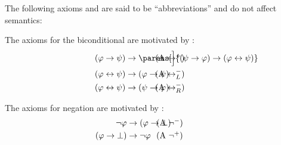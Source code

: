 \begin{definition}
  The following axioms and are said to be \enquote{abbreviations} and do not affect semantics:
  \begin{thmenum}[resume=def:minimal_propositional_axiomatic_deductive_system]
     The axioms for the biconditional are motivated by :
    \begin{align}
      \mathllap{ (\varphi \rightarrow \psi)     } &\rightarrow \mathrlap{ \parens[\Big]{ (\psi \rightarrow \varphi) \rightarrow (\varphi \leftrightarrow \psi) } } \tag{\textrm{A} \( \leftrightarrow^+ \)} \label{def:minimal_propositional_axiomatic_deductive_system/iff/intro} \\
      \mathllap{ (\varphi \leftrightarrow \psi)  }&\rightarrow \mathrlap{ (\varphi \rightarrow \psi) } \tag{\textrm{A} \( \leftrightarrow_L^- \)} \label{eq:def:minimal_propositional_axiomatic_deductive_system/iff/elim_left} \\
      \mathllap{ (\varphi \leftrightarrow \psi) } &\rightarrow \mathrlap{ (\psi \rightarrow \varphi) } \tag{\textrm{A} \( \leftrightarrow_R^- \)} \label{eq:def:minimal_propositional_axiomatic_deductive_system/iff/elim_right}
    \end{align}

     The axioms for negation are motivated by :
    \begin{align}
      \mathllap{ \neg \varphi }               &\rightarrow \mathrlap{ (\varphi \rightarrow \bot) } \tag{\textrm{A} \( \neg^- \)} \label{eq:def:minimal_propositional_axiomatic_deductive_system/neg/elim} \\
      \mathllap{ (\varphi \rightarrow \bot) } &\rightarrow \mathrlap{ \neg \varphi } \tag{\textrm{A} \( \neg^+ \)} \label{eq:def:minimal_propositional_axiomatic_deductive_system/neg/intro}
    \end{align}
  \end{thmenum}
\end{definition}

